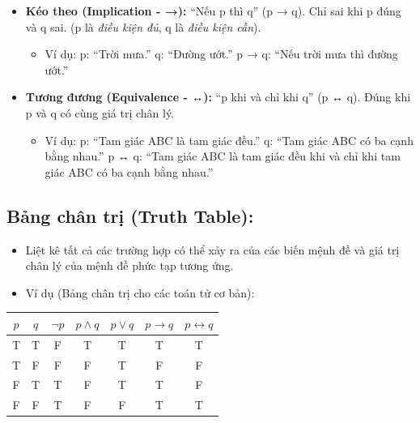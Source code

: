 \documentclass[11pt,a4paper]{article}
\begin{document}
\begin{itemize}
\begin{itemize}
\begin{itemize}
      \begin{itemize}
      \item
        Ví dụ: p: ``Tôi sẽ đi xem phim.'' q: ``Tôi sẽ đi ăn tối.'' p ∨ q: ``Tôi sẽ đi xem phim hoặc tôi sẽ đi ăn tối.''
      \end{itemize}
    \item
      \textbf{Kéo theo (Implication - →):} ``Nếu p thì q'' (p → q). Chỉ sai khi p đúng và q sai. (p là \emph{điều kiện đủ}, q là \emph{điều kiện cần}).

      \begin{itemize}
      \item
        Ví dụ: p: ``Trời mưa.'' q: ``Đường ướt.'' p → q: ``Nếu trời mưa thì đường ướt.''
      \end{itemize}
    \item
      \textbf{Tương đương (Equivalence - ↔):} ``p khi và chỉ khi q'' (p ↔ q). Đúng khi p và q có cùng giá trị chân lý.

      \begin{itemize}
      \item
        Ví dụ: p: ``Tam giác ABC là tam giác đều.'' q: ``Tam giác ABC có ba cạnh bằng nhau.'' p ↔ q: ``Tam giác ABC là tam giác đều khi và chỉ khi tam giác ABC có ba cạnh bằng nhau.''
      \end{itemize}
    \end{itemize}
  \end{itemize}
\end{itemize}

\Needspace{172.4pt}

\subsection{Bảng chân trị (Truth Table):}

\begin{itemize}
\item
  Liệt kê tất cả các trường hợp có thể xảy ra của các biến mệnh đề và giá trị chân lý của mệnh đề phức tạp tương ứng.
\item
  Ví dụ (Bảng chân trị cho các toán tử cơ bản):
\end{itemize}

\begin{center}
\renewcommand{\arraystretch}{1.22}
\setlength{\tabcolsep}{13pt}
\begin{tabular}{*{7}{c}}
\toprule
\(p\) & \(q\) & \(\neg p\) & \(p\land q\) & \(p\lor q\) & \(p\to q\) & \(p\leftrightarrow q\) \\
\midrule
T & T & F & T & T & T & T \\
T & F & F & F & T & F & F \\
F & T & T & F & T & T & F \\
F & F & T & F & F & T & T \\
\bottomrule
\end{tabular}
\end{center}
\end{document}
